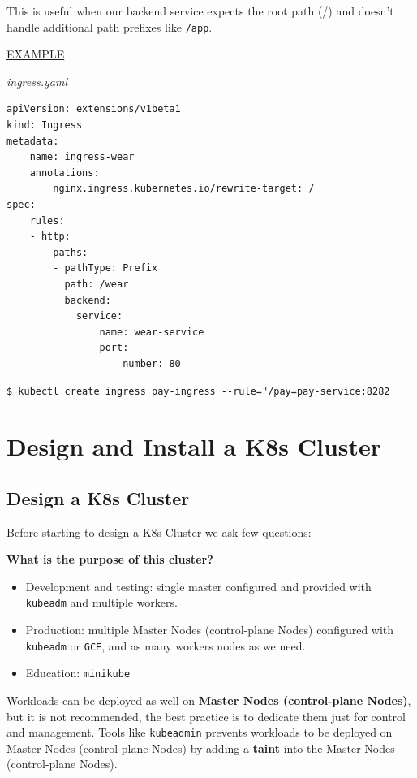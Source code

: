 \documentclass{article}
\newenvironment{blocktemplateIII}[1]{%
    \tcolorbox[beamer,%
    noparskip,breakable,
    ,colframe=Red,%
    colbacklower=LimeGreen!75!LightGreen,%
    title=#1]}%
    {\endtcolorbox}
\newenvironment{codetemplate}[1][]{%
  \mybasecolorbox[#1]
  \itshape
}{%
  \endmybasecolorbox
}
\begin{document}
This is useful when our backend service expects the root path (/) and doesn't handle 
additional path prefixes like \verb|/app|.

\underline{EXAMPLE}

\begin{codetemplate}{ingress.yaml}
\begin{verbatim}
apiVersion: extensions/v1beta1
kind: Ingress
metadata:
    name: ingress-wear
    annotations:
        nginx.ingress.kubernetes.io/rewrite-target: /
spec:
    rules:
    - http:
        paths:
        - pathType: Prefix
          path: /wear
          backend:
            service:
                name: wear-service
                port:
                    number: 80
\end{verbatim}
\end{codetemplate}

\begin{codetemplate}{}
\begin{verbatim}
$ kubectl create ingress pay-ingress --rule="/pay=pay-service:8282
\end{verbatim}
\end{codetemplate}

\newpage
\section{Design and Install a K8s Cluster}
\subsection{Design a K8s Cluster}
Before starting to design a K8s Cluster we ask few questions:

\textbf{What is the purpose of this cluster?}
\begin{itemize}
    \item Development and testing: single master configured and provided with \verb|kubeadm| and multiple workers.
    \item Production: multiple Master Nodes (control-plane Nodes) configured with \verb|kubeadm| or \verb|GCE|, and as many workers nodes as we need.
    \item Education: \verb|minikube|
\end{itemize}

\begin{blocktemplateIII}{WARNING}
Workloads can be deployed as well on \textbf{Master Nodes (control-plane Nodes)}, but it is not recommended, the best practice is to dedicate them just for control and management. 
Tools like \verb|kubeadmin| prevents workloads to be deployed on Master Nodes (control-plane Nodes) by adding a \textbf{taint} into the Master Nodes (control-plane Nodes).
\end{blocktemplateIII}
\end{document}
